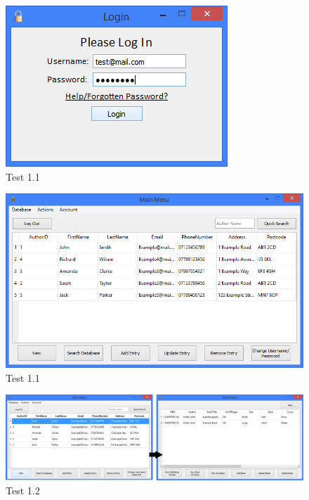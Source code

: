 \begin{landscape}
\begin{figure}[H]
    \includegraphics[width=\textwidth]{./Testing/Evidence/LoginTestSucceed.png}
    \caption{Test 1.1}  \label{fig:LoginTestSucceed}
\end{figure}

\begin{figure}[H]
    \includegraphics[width=\textwidth]{./Testing/Evidence/LoginTestSucceed2.png}
    \caption{Test 1.1}  \label{fig:LoginTestSucceed2}
\end{figure}

\begin{figure}[H]
    \includegraphics[width=\textwidth]{./Testing/Evidence/ViewButtonTest.png}
    \caption{Test 1.2}  \label{fig:ViewButtonTest}
\end{figure}


\end{landscape}
